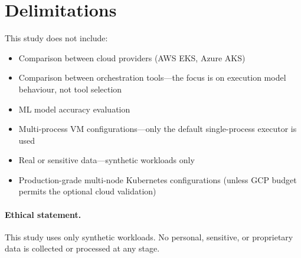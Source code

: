 
\section{Delimitations}
\label{sec:delimitations}

This study does not include:

\begin{itemize}
  \item Comparison between cloud providers (AWS EKS, Azure AKS)
  \item Comparison between orchestration tools---the focus is on execution model behaviour, not tool selection
  \item ML model accuracy evaluation
  \item Multi-process VM configurations---only the default single-process executor is used
  \item Real or sensitive data---synthetic workloads only
  \item Production-grade multi-node Kubernetes configurations (unless GCP budget permits the optional cloud validation)
\end{itemize}

\paragraph{Ethical statement.}
This study uses only synthetic workloads. No personal, sensitive, or proprietary data is collected or processed at any stage.
